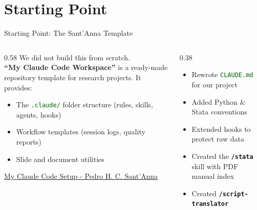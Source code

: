 \documentclass[aspectratio=169,11pt,dvipsnames]{beamer}
\newcommand{\skill}[1]{\texttt{\textcolor{defaultclr}{\textbf{/#1}}}}
\newcommand{\file}[1]{\textcolor{darkgreen}{\nolinkurl{#1}}}
\begin{document}
\section{Starting Point}

\begin{frame}[fragile]{Starting Point: The Sant'Anna Template}
\scriptsize
  \begin{columns}[T]
    \begin{column}{0.58\textwidth}
      We did not build this from scratch.\\[0.4cm]
      \textbf{``My Claude Code Workspace''} is a ready-made
      repository template for research projects. It provides:
      \begin{itemize}
        \item The \file{.claude/} folder structure (rules, skills, agents, hooks)
        \item Workflow templates (session logs, quality reports)
        \item Slide and document utilities
      \end{itemize}
      \vspace{0.3cm}
      \begin{greenbox}[title=Find it at:]
\href{https://psantanna.com/claude-code-my-workflow/workflow-guide.html}{My Claude Code Setup - Pedro H. C. Sant'Anna}
\end{greenbox}
    \end{column}
    \begin{column}{0.38\textwidth}
      \begin{greenbox}[title=What we then customized]
        \begin{itemize}
          \item Rewrote \file{CLAUDE.md} for our project
          \item Added Python \& Stata conventions
          \item Extended hooks to protect raw data
          \item Created the \skill{stata} skill with PDF manual index
          \item Created \skill{script-translator}
        \end{itemize}
      \end{greenbox}
    \end{column}
  \end{columns}
\end{frame}
\end{document}
